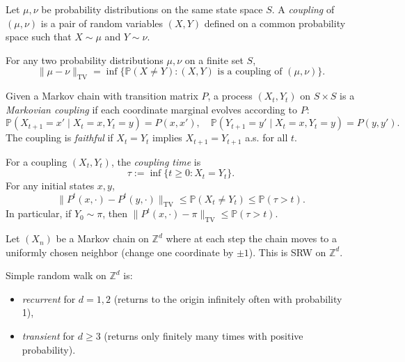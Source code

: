 \documentclass[answers,12pt,addpoints]{exam}
\begin{document}
\begin{definition}
Let $\mu,\nu$ be probability distributions on the same state space $S$. A \emph{coupling} of $(\mu,\nu)$ is a pair of random variables $(X,Y)$ defined on a common probability space such that $X\sim \mu$ and $Y\sim \nu$.
\end{definition}

\begin{theorem}
For any two probability distributions $\mu,\nu$ on a finite set $S$,
\[
\|\mu-\nu\|_{\mathrm{TV}} = \inf\{ \mathbb{P}(X\neq Y) : (X,Y) \text{ is a coupling of }(\mu,\nu)\}.
\]
\end{theorem}

\begin{definition}
Given a Markov chain with transition matrix $P$, a process $(X_t,Y_t)$ on $S\times S$ is a \emph{Markovian coupling} if each coordinate marginal evolves according to $P$:
\[
\mathbb{P}(X_{t+1}=x'\mid X_t=x,Y_t=y)=P(x,x'),\quad
\mathbb{P}(Y_{t+1}=y'\mid X_t=x,Y_t=y)=P(y,y').
\]
The coupling is \emph{faithful} if $X_t=Y_t$ implies $X_{t+1}=Y_{t+1}$ a.s. for all $t$.
\end{definition}

\begin{definition}
For a coupling $(X_t,Y_t)$, the \emph{coupling time} is
\[
\tau := \inf\{t\ge 0 : X_t = Y_t\}.
\]
For any initial states $x,y$,
\[
\|P^t(x,\cdot) - P^t(y,\cdot)\|_{\mathrm{TV}} \le \mathbb{P}(X_t\neq Y_t) \le \mathbb{P}(\tau > t).
\]
In particular, if $Y_0\sim \pi$, then $\|P^t(x,\cdot)-\pi\|_{\mathrm{TV}} \le \mathbb{P}(\tau>t)$.
\end{definition}

\begin{definition}
Let $(X_n)$ be a Markov chain on $\mathbb{Z}^d$ where at each step the chain moves to a uniformly chosen neighbor (change one coordinate by $\pm 1$). This is SRW on $\mathbb{Z}^d$.
\end{definition}

\begin{theorem}
Simple random walk on $\mathbb{Z}^d$ is:
\begin{itemize}
\item \emph{recurrent} for $d=1,2$ (returns to the origin infinitely often with probability 1),
\item \emph{transient} for $d\ge 3$ (returns only finitely many times with positive probability).
\end{itemize}
\end{theorem}
\end{document}
